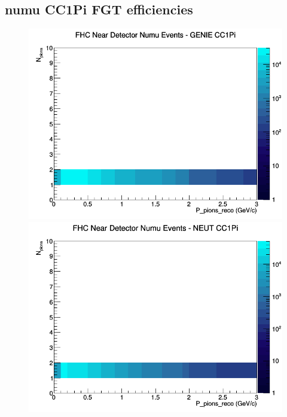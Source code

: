 \documentclass[12pt]{article}
\begin{document}
\subsection{numu CC1Pi FGT efficiencies}
\begin{figure}[h]
\includegraphics[width=\linewidth]{eff_N_P/FGT/pions/CC1Pi_FHC_ND_numu_N_P_GENIE.png}
\endminipage
{}
\includegraphics[width=\linewidth]{eff_N_P/FGT/pions/CC1Pi_FHC_ND_numu_N_P_NEUT.png}
\endminipage
{}

\end{figure}
\end{document}
